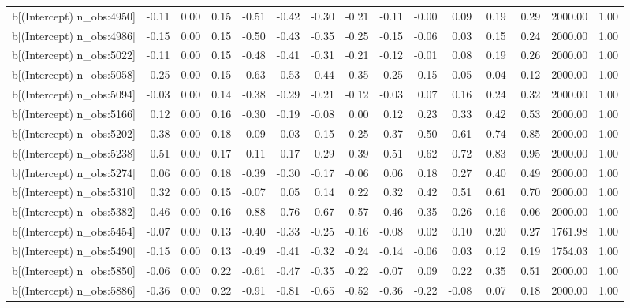 \begin{table}[ht]
\begin{tabular}{rrrrrrrrrrrrrrr}
  b[(Intercept) n\_obs:4950] & -0.11 & 0.00 & 0.15 & -0.51 & -0.42 & -0.30 & -0.21 & -0.11 & -0.00 & 0.09 & 0.19 & 0.29 & 2000.00 & 1.00 \\ 
  b[(Intercept) n\_obs:4986] & -0.15 & 0.00 & 0.15 & -0.50 & -0.43 & -0.35 & -0.25 & -0.15 & -0.06 & 0.03 & 0.15 & 0.24 & 2000.00 & 1.00 \\ 
  b[(Intercept) n\_obs:5022] & -0.11 & 0.00 & 0.15 & -0.48 & -0.41 & -0.31 & -0.21 & -0.12 & -0.01 & 0.08 & 0.19 & 0.26 & 2000.00 & 1.00 \\ 
  b[(Intercept) n\_obs:5058] & -0.25 & 0.00 & 0.15 & -0.63 & -0.53 & -0.44 & -0.35 & -0.25 & -0.15 & -0.05 & 0.04 & 0.12 & 2000.00 & 1.00 \\ 
  b[(Intercept) n\_obs:5094] & -0.03 & 0.00 & 0.14 & -0.38 & -0.29 & -0.21 & -0.12 & -0.03 & 0.07 & 0.16 & 0.24 & 0.32 & 2000.00 & 1.00 \\ 
  b[(Intercept) n\_obs:5166] & 0.12 & 0.00 & 0.16 & -0.30 & -0.19 & -0.08 & 0.00 & 0.12 & 0.23 & 0.33 & 0.42 & 0.53 & 2000.00 & 1.00 \\ 
  b[(Intercept) n\_obs:5202] & 0.38 & 0.00 & 0.18 & -0.09 & 0.03 & 0.15 & 0.25 & 0.37 & 0.50 & 0.61 & 0.74 & 0.85 & 2000.00 & 1.00 \\ 
  b[(Intercept) n\_obs:5238] & 0.51 & 0.00 & 0.17 & 0.11 & 0.17 & 0.29 & 0.39 & 0.51 & 0.62 & 0.72 & 0.83 & 0.95 & 2000.00 & 1.00 \\ 
  b[(Intercept) n\_obs:5274] & 0.06 & 0.00 & 0.18 & -0.39 & -0.30 & -0.17 & -0.06 & 0.06 & 0.18 & 0.27 & 0.40 & 0.49 & 2000.00 & 1.00 \\ 
  b[(Intercept) n\_obs:5310] & 0.32 & 0.00 & 0.15 & -0.07 & 0.05 & 0.14 & 0.22 & 0.32 & 0.42 & 0.51 & 0.61 & 0.70 & 2000.00 & 1.00 \\ 
  b[(Intercept) n\_obs:5382] & -0.46 & 0.00 & 0.16 & -0.88 & -0.76 & -0.67 & -0.57 & -0.46 & -0.35 & -0.26 & -0.16 & -0.06 & 2000.00 & 1.00 \\ 
  b[(Intercept) n\_obs:5454] & -0.07 & 0.00 & 0.13 & -0.40 & -0.33 & -0.25 & -0.16 & -0.08 & 0.02 & 0.10 & 0.20 & 0.27 & 1761.98 & 1.00 \\ 
  b[(Intercept) n\_obs:5490] & -0.15 & 0.00 & 0.13 & -0.49 & -0.41 & -0.32 & -0.24 & -0.14 & -0.06 & 0.03 & 0.12 & 0.19 & 1754.03 & 1.00 \\ 
  b[(Intercept) n\_obs:5850] & -0.06 & 0.00 & 0.22 & -0.61 & -0.47 & -0.35 & -0.22 & -0.07 & 0.09 & 0.22 & 0.35 & 0.51 & 2000.00 & 1.00 \\ 
  b[(Intercept) n\_obs:5886] & -0.36 & 0.00 & 0.22 & -0.91 & -0.81 & -0.65 & -0.52 & -0.36 & -0.22 & -0.08 & 0.07 & 0.18 & 2000.00 & 1.00 \\ 

\end{tabular}
\end{table}
